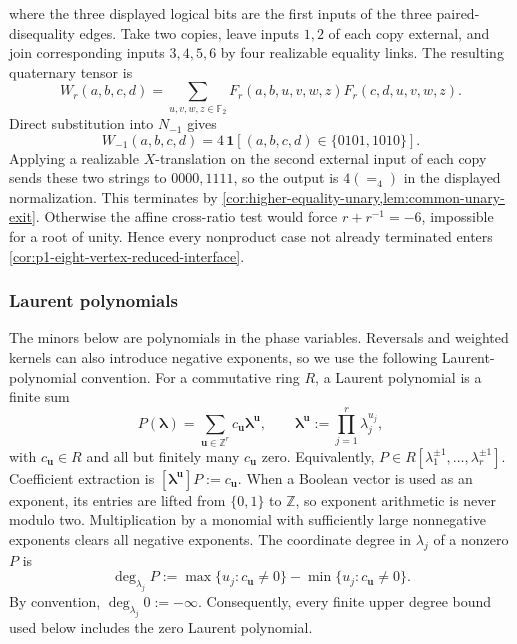 \documentclass[11pt,letterpaper,onecolumn]{article}
\theoremstyle{plain}
\theoremstyle{definition}
\theoremstyle{remark}
\newcommand{\Ftwo}{\mathbb F_2}
\newcommand{\Eq}{=}
\newcommand{\one}{\mathbf 1}
\begin{document}
where the three displayed logical bits are the first inputs of the three
paired-disequality edges.  Take two copies, leave inputs \(1,2\) of each copy
external, and join corresponding inputs \(3,4,5,6\) by four realizable equality
links.  The resulting quaternary tensor is
\hypertarget{eq:app-nd-r-minus-one-wiring}{}
\begin{equation*}
 W_r(a,b,c,d)=\sum_{u,v,w,z\in\Ftwo}
 F_r(a,b,u,v,w,z)F_r(c,d,u,v,w,z).
\end{equation*}
Direct substitution into \(N_{-1}\) gives
\[
 W_{-1}(a,b,c,d)=4\,\one[(a,b,c,d)\in\{0101,1010\}].
\]
Applying a realizable \(X\)-translation on the second external input of each
copy sends these two strings to \(0000,1111\), so the output is
\(4(\Eq_4)\) in the displayed normalization.  This terminates by
\cref{cor:higher-equality-unary,lem:common-unary-exit}.  Otherwise the
affine cross-ratio test would force
\(r+r^{-1}=-6\), impossible for a root of unity.  Hence every nonproduct
case not already terminated enters
\cref{cor:p1-eight-vertex-reduced-interface}.

\subsubsection{Laurent polynomials}
\label{subsubsec:laurent-polynomials}
\label{subsec:laurent-gauge-conventions}

The minors below are polynomials in the phase variables. Reversals and
weighted kernels can also introduce negative exponents, so we use the
following Laurent-polynomial convention. For a commutative ring \(R\),
a Laurent polynomial is a finite sum
\[
 P({\boldsymbol\lambda})=\sum_{{\mathbf{u}}\in\mathbb Z^r}c_{\mathbf{u}}{\boldsymbol\lambda}^{\mathbf{u}},
 \qquad
 {\boldsymbol\lambda}^{\mathbf{u}}:=\prod_{j=1}^r\lambda_j^{u_j},
\]
with \(c_{\mathbf{u}}\in R\) and all but finitely many \(c_{\mathbf{u}}\) zero. Equivalently,
\(P\in R[\lambda_1^{\pm1},\ldots,\lambda_r^{\pm1}]\).  Coefficient
extraction is \([{\boldsymbol\lambda}^{\mathbf{u}}]P:=c_{\mathbf{u}}\).  When a
Boolean vector is used as an exponent, its entries are lifted from
\(\{0,1\}\) to \(\mathbb Z\), so exponent arithmetic is never modulo two.
Multiplication by a monomial with sufficiently large nonnegative
exponents clears all negative exponents. The coordinate degree in
\(\lambda_j\) of a nonzero \(P\) is
\[
 \deg_{\lambda_j}P
 :=\max\{u_j:c_{\mathbf{u}}\ne0\}-\min\{u_j:c_{\mathbf{u}}\ne0\}.
\]
By convention, \(\deg_{\lambda_j}0:=-\infty\). Consequently, every finite
upper degree bound used below includes the zero Laurent polynomial.
\end{document}
